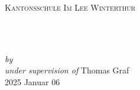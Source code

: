 \begin{titlepage}
    \vspace*{5cm}
    \makeatletter
    \begin{center}
      \textsc{Kantonsschule Im Lee Winterthur}\\
      \vspace*{1cm}
      \begin{Huge}
        \@title
      \end{Huge}\\[0.1cm]
      \begin{Large}
        \@subtitle
      \end{Large}\\
      \emph{by}
      \@author\\
      \emph{under supervision of}
      Thomas Graf\\
      \vfill
      2025 Januar 06
    \end{center}
    \makeatother
\end{titlepage}
  
\newpage
\null
\thispagestyle{empty}
\newpage
  